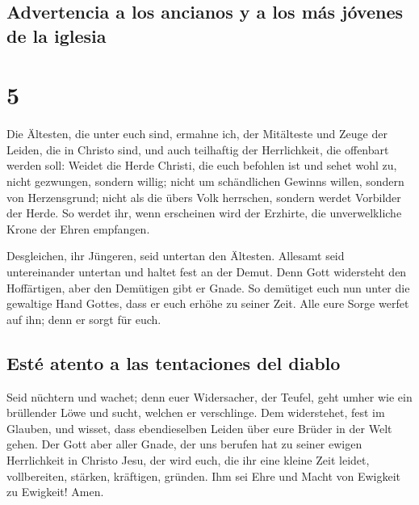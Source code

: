 \hypertarget{advertencia-a-los-ancianos-y-a-los-muxe1s-juxf3venes-de-la-iglesia}{%
\subsection{Advertencia a los ancianos y a los más jóvenes de la
iglesia}\label{advertencia-a-los-ancianos-y-a-los-muxe1s-juxf3venes-de-la-iglesia}}

\hypertarget{section-4}{%
\section{5}\label{section-4}}

 Die Ältesten, die unter euch sind, ermahne ich, der
Mitälteste und Zeuge der Leiden, die in Christo sind, und auch
teilhaftig der Herrlichkeit, die offenbart werden soll: 
Weidet die Herde Christi, die euch befohlen ist und sehet wohl zu, nicht
gezwungen, sondern willig; nicht um schändlichen Gewinns willen, sondern
von Herzensgrund;  nicht als die übers Volk herrschen,
sondern werdet Vorbilder der Herde.  So werdet ihr, wenn
erscheinen wird der Erzhirte, die unverwelkliche Krone der Ehren
empfangen.

 Desgleichen, ihr Jüngeren, seid untertan den Ältesten.
Allesamt seid untereinander untertan und haltet fest an der Demut. Denn
Gott widersteht den Hoffärtigen, aber den Demütigen gibt er Gnade.
 So demütiget euch nun unter die gewaltige Hand Gottes,
dass er euch erhöhe zu seiner Zeit.  Alle eure Sorge
werfet auf ihn; denn er sorgt für euch.

\hypertarget{estuxe9-atento-a-las-tentaciones-del-diablo}{%
\subsection{Esté atento a las tentaciones del
diablo}\label{estuxe9-atento-a-las-tentaciones-del-diablo}}

 Seid nüchtern und wachet; denn euer Widersacher, der
Teufel, geht umher wie ein brüllender Löwe und sucht, welchen er
verschlinge.  Dem widerstehet, fest im Glauben, und
wisset, dass ebendieselben Leiden über eure Brüder in der Welt gehen.
 Der Gott aber aller Gnade, der uns berufen hat zu seiner
ewigen Herrlichkeit in Christo Jesu, der wird euch, die ihr eine kleine
Zeit leidet, vollbereiten, stärken, kräftigen, gründen. 
Ihm sei Ehre und Macht von Ewigkeit zu Ewigkeit! Amen.

